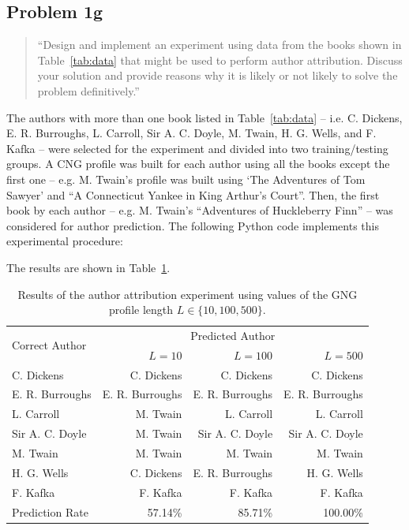 \documentclass[conference]{IEEEtran}
\newcommand{\codefile}[1]{
  \begin{framed}
  \fontsize{5.65}{6.78}\selectfont
  
  \end{framed}
}
\begin{document}
\subsection{Problem 1g}

\begin{quote}
``Design and implement an experiment using data from the books shown in Table~\ref{tab:data}
that might be used to perform author attribution. Discuss your solution and provide reasons 
why it is likely or not likely to solve the problem definitively.''
\end{quote}

The authors with more than one book listed in Table~\ref{tab:data} 
-- i.e. C. Dickens, E. R. Burroughs, L. Carroll, Sir A. C. Doyle, M. Twain, 
H. G. Wells, and F. Kafka -- were selected for the experiment and divided 
into two training/testing groups. A CNG profile was built for each author using 
all the books except the first one -- e.g. M. Twain's profile was built using 
`The Adventures of Tom Sawyer' and ``A Connecticut Yankee in King Arthur's Court''. 
Then, the first book by each author -- e.g. M. Twain's ``Adventures of Huckleberry Finn'' 
-- was considered for author prediction. The following Python code implements 
this experimental procedure:

\codefile{problem1g.py}

The results are shown in Table~\ref{tab:problem1g}.


\begin{table}
\caption{\hspace{1.4em}Results of the author attribution experiment using \newline
values of the GNG profile length $L\in\{10,100,500\}$.\label{tab:problem1g}}
\vspace{-10pt}
\begin{center}
\begin{tabular}{lr@{\hspace{1em}}r@{\hspace{1em}}r}
\hline 
\multirow{2}{*}{Correct Author} & \multicolumn{3}{c}{Predicted Author}\tabularnewline
\cline{2-4} 
 & $L=10$ & $L=100$ & $L=500$\tabularnewline
\hline
C. Dickens & C. Dickens & C. Dickens & C. Dickens \\
E. R. Burroughs & E. R. Burroughs & E. R. Burroughs & E. R. Burroughs \\
L. Carroll & M. Twain & L. Carroll & L. Carroll \\
Sir A. C. Doyle & M. Twain & Sir A. C. Doyle & Sir A. C. Doyle \\
M. Twain & M. Twain & M. Twain & M. Twain \\
H. G. Wells & C. Dickens & E. R. Burroughs & H. G. Wells \\
F. Kafka & F. Kafka & F. Kafka & F. Kafka \\
\hline
Prediction Rate & 57.14\% & 85.71\% & 100.00\%\\
\hline
\end{tabular}
\end{center}
\end{table} 
    
\end{document}
